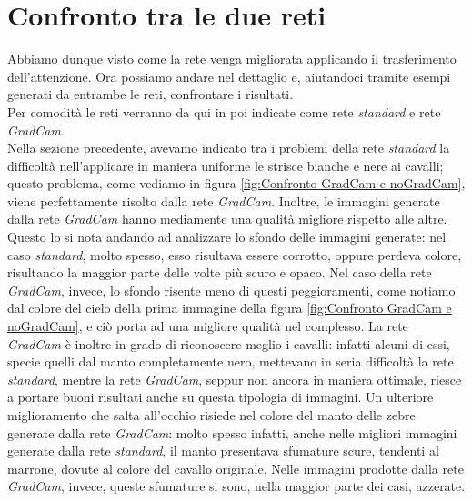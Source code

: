 \section{Confronto tra le due reti}
Abbiamo dunque visto come la rete venga migliorata applicando il trasferimento dell'attenzione. Ora possiamo andare nel dettaglio e, aiutandoci tramite esempi generati da entrambe le reti, confrontare i risultati.
\\Per comodità le reti verranno da qui in poi indicate come rete \emph{standard} e rete \emph{GradCam}.
\\Nella sezione precedente, avevamo indicato tra i problemi della rete \emph{standard} la difficoltà nell'applicare in maniera uniforme le strisce bianche e nere ai cavalli; questo problema, come vediamo in figura \ref{fig:Confronto GradCam e noGradCam}, viene perfettamente risolto dalla rete \emph{GradCam}. Inoltre, le immagini generate dalla rete \emph{GradCam} hanno mediamente una qualità migliore rispetto alle altre. Questo lo si nota andando ad analizzare lo sfondo delle immagini generate: nel caso \emph{standard}, molto spesso, esso risultava essere corrotto, oppure perdeva colore, risultando la maggior parte delle volte più scuro e opaco. Nel caso della rete \emph{GradCam}, invece, lo sfondo risente meno di questi peggioramenti, come notiamo dal colore del cielo della prima immagine della figura \ref{fig:Confronto GradCam e noGradCam}, e ciò porta ad una migliore qualità nel complesso. La rete \emph{GradCam} è inoltre in grado di riconoscere meglio i cavalli: infatti alcuni di essi, specie quelli dal manto completamente nero, mettevano in seria difficoltà la rete \emph{standard}, mentre la rete \emph{GradCam}, seppur non ancora in maniera ottimale, riesce a portare buoni risultati anche su questa tipologia di immagini.
Un ulteriore miglioramento che salta all'occhio risiede nel colore del manto delle zebre generate dalla rete \emph{GradCam}: molto spesso infatti, anche nelle migliori immagini generate dalla rete \emph{standard}, il manto presentava sfumature scure, tendenti al marrone, dovute al colore del cavallo originale. Nelle immagini prodotte dalla rete \emph{GradCam}, invece, queste sfumature si sono, nella maggior parte dei casi, azzerate.



